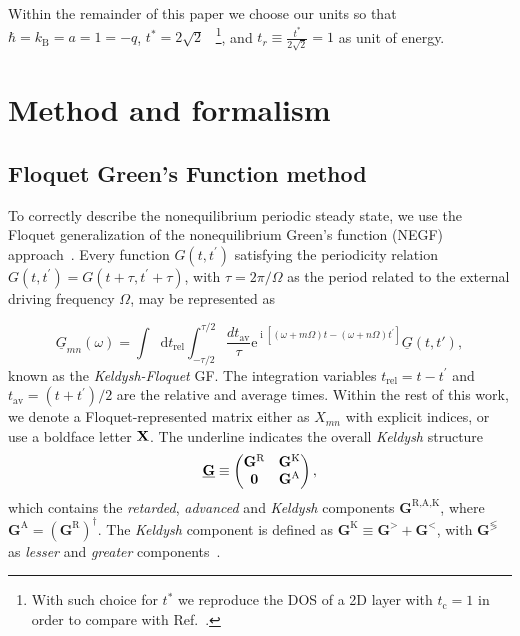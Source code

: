 \documentclass[aps,prb,groupedaddress,showpacs,twocolumn,superscriptaddress,10pt]{revtex4-2}
\newcommand{\ee}{\mathrm{e}}  %
\DeclareMathOperator*{\ii}{i} %
\newcommand*\dd{\mathop{}\!\mathrm{d}}
\begin{document}
Within the remainder of this paper we choose our units so that  $\hbar = k_{\text{B}} = a = 1 = -q$, $t^{\ast}=2\sqrt{2}$ ~\footnote{With such choice for $t^{\ast}$ we reproduce the DOS of a 2D layer with $t_{\text{c}}=1$  in order to compare with Ref.~\cite{so.do.18}.}, and $t_r \equiv \frac{t^{\ast}}{2\sqrt{2}}=1$ as unit of energy.  
  

\section{Method and formalism}    
\label{sec:Method_formalism}  

\subsection{Floquet Green's Function method}   
\label{sec:GFs_Dyson_Floquet}

To correctly describe the nonequilibrium periodic steady state, we use the Floquet generalization of the nonequilibrium Green's function (NEGF) 
approach~\cite{ts.ok.08,sc.mo.02u,jo.fr.08}. Every function $G(t,t^{\prime})$ satisfying the periodicity relation $G(t,t^{\prime})=G(t+\tau,t^{\prime}+\tau)$, with $\tau=2\pi/\Omega$ as the period related to the external driving frequency $\Omega$, may be represented as~\cite{ts.ok.08,sc.mo.02u,jo.fr.08}

\begin{equation}
\label{eq:FloquetGF} 
\underline{G}_{mn}(\omega) =\int \dd t_{\text{rel}} \int_{-\tau/2}^{\tau/2} \frac{dt_{\text{av}}}{\tau} \ee^{\ii[\left(\omega+m\Omega\right) t -\left( \omega+n\Omega\right)t^{\prime}]} \underline{G}(t,t'),
\end{equation}
known as the \emph{Keldysh-Floquet} GF. The integration variables $t_{\text{rel}} = t-t^{\prime}$ and $t_{\text{av}} = (t+t^{\prime})/2$ are the relative and average times. Within the rest of this work, we denote a Floquet-represented matrix either as $X_{mn}$ with explicit indices, or use a boldface letter $\bf{X}$. The underline indicates the overall \emph{Keldysh} structure
%
\begin{equation}\label{eq:Keld-structure}
\underline{{\bf G}} \equiv 
\begin{pmatrix}
{\bf G}^{\text{R}} & {\bf G}^{\text{K}}\\
{\bf 0}         & {\bf G}^{\text{A}} \\
\end{pmatrix},
\end{equation}
%
which contains the \emph{retarded}, \emph{advanced} and \emph{Keldysh} components $\textbf{G}^{\text{R,A,K}}$, where $\textbf{G}^{\text{A}}=(\textbf{G}^{\text{R}})^{\dagger}$. The \emph{Keldysh} component is defined as $\textbf{G}^{\text{K}} \equiv \textbf{G}^{>} + \textbf{G}^{<}$, with $\textbf{G}^{\lessgtr}$ as \emph{lesser} and \emph{greater} components~\cite{schw.61,keld.65,ra.sm.86,ha.ja}.
  
\end{document}
